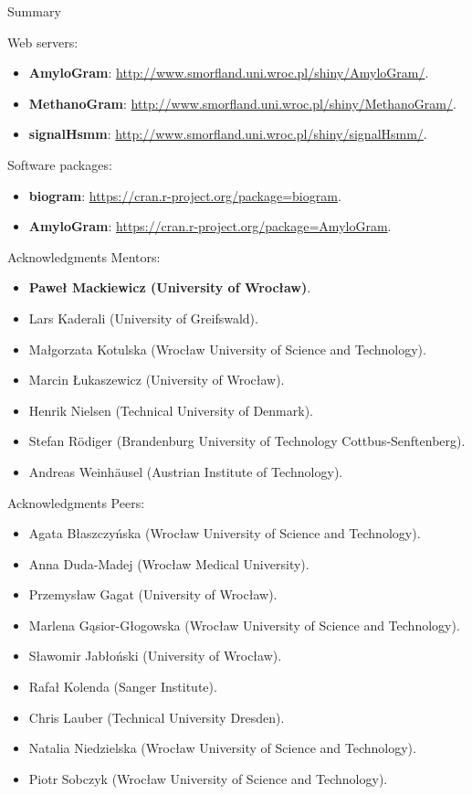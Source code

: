 \documentclass{beamer}\usepackage[]{graphicx}\usepackage[]{color}
\begin{document}
\begin{frame}{Summary}

Web servers:
\begin{itemize}
\item \textbf{AmyloGram}: \url{http://www.smorfland.uni.wroc.pl/shiny/AmyloGram/}.
\item \textbf{MethanoGram}: \url{http://www.smorfland.uni.wroc.pl/shiny/MethanoGram/}.
\item \textbf{signalHsmm}: \url{http://www.smorfland.uni.wroc.pl/shiny/signalHsmm/}.
\end{itemize}


Software packages:
\begin{itemize}
\item \textbf{biogram}: \url{https://cran.r-project.org/package=biogram}.
\item \textbf{AmyloGram}: \url{https://cran.r-project.org/package=AmyloGram}.
\end{itemize}


\end{frame}  

\begin{frame}{Acknowledgments}
Mentors:
\begin{itemize}
\item \textbf{Paweł Mackiewicz (University of Wrocław)}.
\item Lars Kaderali (University of Greifswald).
\item Małgorzata Kotulska (Wrocław University of Science and Technology).
\item Marcin Łukaszewicz (University of Wrocław).
\item Henrik Nielsen (Technical University of Denmark).
\item Stefan Rödiger (Brandenburg University of Technology Cottbus-Senftenberg).
\item Andreas Weinhäusel (Austrian Institute of Technology).
\end{itemize}
\end{frame}


\begin{frame}{Acknowledgments}
Peers:
\begin{itemize}
\item Agata Błaszczyńska (Wrocław University of Science and Technology).
\item Anna Duda-Madej (Wrocław Medical University).
\item Przemysław Gagat (University of Wrocław).
\item Marlena G\k{a}sior-Głogowska (Wrocław University of Science and Technology).
\item Sławomir Jabłoński (University of Wrocław).
\item Rafał Kolenda (Sanger Institute).
\item Chris Lauber (Technical University Dresden).
\item Natalia Niedzielska (Wrocław University of Science and Technology).
\item Piotr Sobczyk (Wrocław University of Science and Technology).
\end{itemize}

\end{frame}
\end{document}
